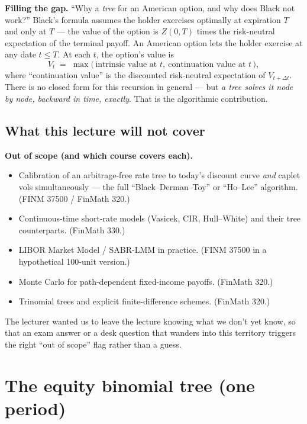 \begin{tipblock}
\textbf{Filling the gap.} ``Why a \emph{tree} for an American option,
and why does Black not work?'' Black's formula assumes the holder
exercises optimally at expiration $T$ and only at $T$ --- the value
of the option is $Z(0,T)$ times the risk-neutral expectation of the
terminal payoff. An American option lets the holder exercise at any
date $t \le T$. At each $t$, the option's value is
\[
  V_t \;=\; \max\bigl(\,\text{intrinsic value at }t,\ \text{continuation value at }t\,\bigr),
\]
where ``continuation value'' is the discounted risk-neutral
expectation of $V_{t+\Delta t}$. There is no closed form for this
recursion in general --- but \emph{a tree solves it node by node,
backward in time, exactly}. That is the algorithmic contribution.
\end{tipblock}

\subsection{What this lecture will not cover}\label{L8-sec:notcover}

\begin{keyblock}
\textbf{Out of scope (and which course covers each).}
\begin{itemize}
  \item Calibration of an arbitrage-free rate tree to today's
        discount curve \emph{and} caplet vols simultaneously --- the
        full ``Black--Derman--Toy'' or ``Ho--Lee'' algorithm. (FINM
        37500 / FinMath 320.)
  \item Continuous-time short-rate models (Vasicek, CIR, Hull--White)
        and their tree counterparts. (FinMath 330.)
  \item LIBOR Market Model / SABR-LMM in practice. (FINM 37500 in a
        hypothetical 100-unit version.)
  \item Monte Carlo for path-dependent fixed-income payoffs.
        (FinMath 320.)
  \item Trinomial trees and explicit finite-difference schemes.
        (FinMath 320.)
\end{itemize}
\end{keyblock}

The lecturer wanted us to leave the lecture knowing what we don't
yet know, so that an exam answer or a desk question that wanders into
this territory triggers the right ``out of scope'' flag rather than
a guess.

\section{The equity binomial tree (one period)}\label{L8-sec:eqone}

